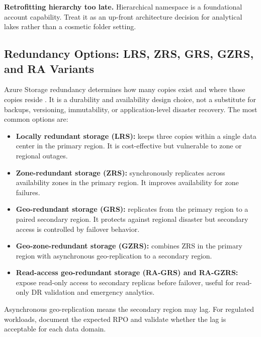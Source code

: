 \begin{pitfall}
\textbf{Retrofitting hierarchy too late.} Hierarchical namespace is a foundational account capability. Treat it as an up-front architecture decision for analytical lakes rather than a cosmetic folder setting.
\end{pitfall}

\subsection{Redundancy Options: LRS, ZRS, GRS, GZRS, and RA Variants}
Azure Storage redundancy determines how many copies exist and where those copies reside \cite{microsoft2025redundancy}. It is a durability and availability design choice, not a substitute for backups, versioning, immutability, or application-level disaster recovery. The most common options are:

\begin{itemize}
    \item \textbf{Locally redundant storage (LRS):} keeps three copies within a single data center in the primary region. It is cost-effective but vulnerable to zone or regional outages.
    \item \textbf{Zone-redundant storage (ZRS):} synchronously replicates across availability zones in the primary region. It improves availability for zone failures.
    \item \textbf{Geo-redundant storage (GRS):} replicates from the primary region to a paired secondary region. It protects against regional disaster but secondary access is controlled by failover behavior.
    \item \textbf{Geo-zone-redundant storage (GZRS):} combines ZRS in the primary region with asynchronous geo-replication to a secondary region.
    \item \textbf{Read-access geo-redundant storage (RA-GRS) and RA-GZRS:} expose read-only access to secondary replicas before failover, useful for read-only DR validation and emergency analytics.
\end{itemize}

\begin{notebox}
Asynchronous geo-replication means the secondary region may lag. For regulated workloads, document the expected RPO and validate whether the lag is acceptable for each data domain.
\end{notebox}

